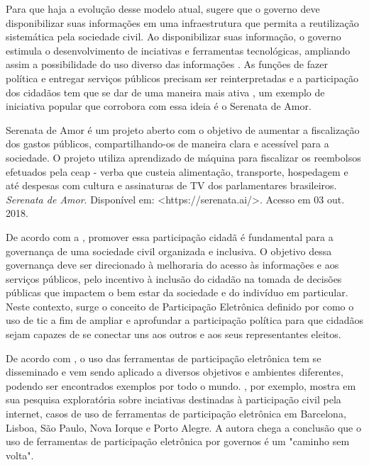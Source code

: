 \par
Para que haja a evolução desse modelo atual,  sugere que o governo deve disponibilizar suas informações em uma infraestrutura que permita a reutilização
sistemática pela sociedade civil. Ao disponibilizar suas informação, o governo estimula o desenvolvimento de inciativas e ferramentas tecnológicas, ampliando assim a possibilidade 
do uso diverso das informações \cite{zuiderwijk2012socio}. As funções de fazer política e entregar serviços públicos precisam ser reinterpretadas e a participação dos cidadãos
tem que se dar de uma maneira mais ativa \cite{bovaird2007beyond}, um exemplo de iniciativa popular que corrobora com essa ideia é o Serenata de Amor.

\par
Serenata de Amor é um projeto aberto com o objetivo de aumentar a fiscalização dos gastos públicos, compartilhando-os de maneira clara e acessível para a sociedade. O projeto utiliza
aprendizado de máquina para fiscalizar os reembolsos efetuados pela \acrfull{ceap} - verba que custeia alimentação, transporte, hospedagem e até despesas com cultura e 
assinaturas de TV dos parlamentares brasileiros. \textit{Serenata de Amor}. Disponível em: <https://serenata.ai/>. Acesso em 03 out. 2018.


\par
De acordo com a , promover essa participação cidadã é fundamental para a governança de uma sociedade civil organizada e inclusiva. O objetivo dessa governança deve
ser direcionado à melhoraria do acesso às informações e aos serviços públicos, pelo incentivo à inclusão do cidadão na tomada de decisões públicas que impactem o bem estar da 
sociedade e do indivíduo em particular.  Neste contexto, surge o conceito de Participação Eletrônica definido por  como o uso de \acrshort{tic}
a fim de ampliar e aprofundar a participação política para que cidadãos sejam capazes de se conectar uns aos outros e aos seus representantes eleitos. 

\par 
De acordo com \cite{medeiros2009novos}, o uso das ferramentas de participação eletrônica tem se disseminado e vem sendo aplicado a diversos objetivos e ambientes diferentes, podendo 
ser encontrados exemplos por todo o mundo. , por exemplo, mostra em sua pesquisa exploratória sobre inciativas destinadas à participação civil
pela internet, casos de uso de ferramentas de participação eletrônica em Barcelona, Lisboa, São Paulo, Nova Iorque e Porto Alegre. A autora chega a conclusão 
que o uso de ferramentas de participação eletrônica por governos é um "caminho sem volta".%


